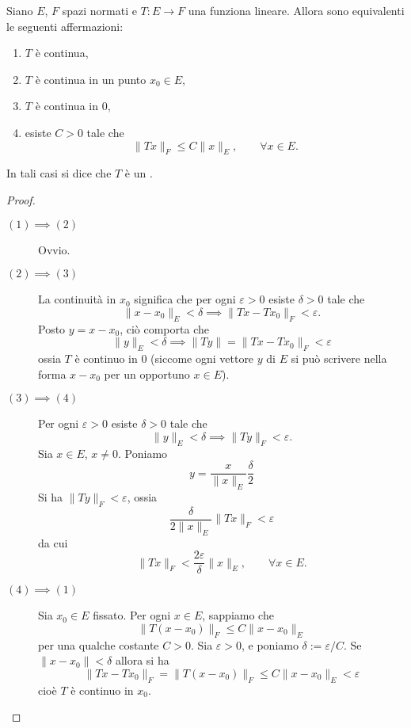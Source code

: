 \begin{theorem}
	Siano $E$, $F$ spazi normati e $T: E \to F$ una funziona lineare. Allora sono equivalenti le seguenti affermazioni:
	\begin{enumerate}
		\item $T$ è continua,
		\item $T$ è continua in un punto $x_0 \in E$,
		\item $T$ è continua in $0$,
		\item esiste $C > 0$ tale che
		$$
			\|Tx\|_F \leq C \|x\|_E, \qquad \forall x \in E.
		$$
	\end{enumerate}
	In tali casi si dice che $T$ è un .
\end{theorem}
\begin{proof}
	\leavevmode
	\begin{description}
		\item[$(1) \implies (2)$] Ovvio.
		\item[$(2) \implies (3)$] La continuità in $x_0$ significa che per ogni $\varepsilon > 0$ esiste $\delta > 0$ tale che
		$$
			\|x-x_0\|_E < \delta \implies \|Tx - Tx_0\|_F < \varepsilon.
		$$
		Posto $y = x-x_0$, ciò comporta che
		$$
			\|y\|_E < \delta \implies \|Ty\| = \|Tx - Tx_0\|_F < \varepsilon
		$$
		ossia $T$ è continuo in $0$ (siccome ogni vettore $y$ di $E$ si può scrivere nella forma $x-x_0$ per un opportuno $x \in E$).
		\item[$(3) \implies (4)$] Per ogni $\varepsilon > 0$ esiste $\delta > 0$ tale che
		$$
			\|y\|_E < \delta \implies \|Ty\|_F < \varepsilon.
		$$
		Sia $x \in E$, $x \neq 0$. Poniamo
		$$
			y = \frac{x}{\|x\|_E}\frac{\delta}2
		$$
		Si ha $\|Ty\|_F < \varepsilon$, ossia
		$$
			\frac{\delta}{2\|x\|_E} \|Tx\|_F < \varepsilon
		$$
		da cui
		$$
			\|Tx\|_F < \frac{2\varepsilon}{\delta} \|x\|_E, \qquad \forall x \in E.
		$$
		\item[$(4) \implies (1)$] Sia $x_0 \in E$ fissato. Per ogni $x \in E$, sappiamo che
		$$
			\|T(x-x_0)\|_F \leq C \|x-x_0\|_E
		$$
		per una qualche costante $C > 0$. Sia $\varepsilon > 0$, e poniamo $\delta := \varepsilon/C$. Se $\|x-x_0\| < \delta$ allora si ha
		$$
			\|Tx - Tx_0\|_F = \|T(x-x_0)\|_F \leq C\|x-x_0\|_E < \varepsilon
		$$
		cioè $T$ è continuo in $x_0$.
	\end{description}
\end{proof}

